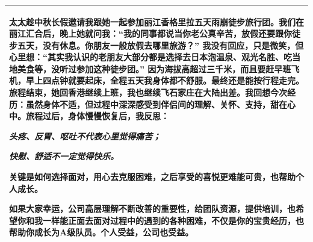 \documentclass[]{article}
\date{}
\providecommand{\tightlist}{%
  \setlength{\itemsep}{0pt}\setlength{\parskip}{0pt}}
\begin{document}
\begin{longtable}[]{@{}l@{}}
\toprule
\endhead
\begin{minipage}[t]{0.97\columnwidth}\raggedright
太太趁中秋长假邀请我跟她一起参加丽江香格里拉五天雨崩徒步旅行团。我们在丽江汇合后，晚上她就问我：``我的同事都说当你老公真辛苦，放假还要跟你徒步五天，没有休息。你朋友一般放假去哪里旅游？''
我没有回应，只是微笑，但心里想：``其实我认识的老朋友大部分都是选择去日本泡温泉、观光名胜、吃当地美食等，没听过参加这种徒步团。''
因为海拔高超过三千米，而且要赶早班飞机，早上四点钟就要起床，全程五天我身体都不舒服。最终还是能按行程走完。旅程结束，她回香港继续上班，我也继续飞石家庄在大陆出差。我回想今次经历：虽然身体不适，但过程中深深感受到伴侣间的理解、关怀、支持，甜在心中。旅程过后，身体慢慢恢复后，我反思：

\begin{description}
\tightlist
\item[]
\emph{头疼、反胃、呕吐不代表心里觉得痛苦；}

\emph{快慰、舒适不一定觉得快乐。}
\end{description}

关键是如何选择面对，用心去克服困难，之后享受的喜悦更难能可贵，也帮助个人成长。

如果大家幸运，公司高层理解不断改善的重要性，给团队资源，提供培训，也希望你和我一样能正面去面对过程中的遇到的各种困难，不仅是你的宝贵经历，也帮助你成长为A级队员。个人受益，公司也受益。\strut


\end{minipage}\tabularnewline
\bottomrule
\end{longtable}
\end{document}
